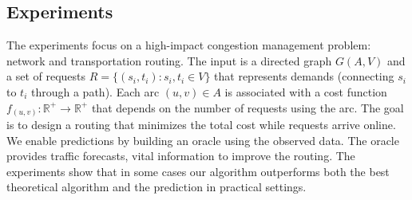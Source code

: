 %
%

\subsection{Experiments}
The experiments focus on a high-impact congestion management problem: network and transportation routing. The input is a directed graph $G(A,V)$ and a set of requests $R = \{(s_{i}, t_{i}) : s_{i}, t_{i} \in V\}$ that represents demands (connecting $s_{i}$ to $t_{i}$ through a path). Each arc $(u, v) \in A$ is associated with a cost function $f_{(u,v)}: \mathbb{R}^{+} \rightarrow \mathbb{R}^{+}$ that depends on the number of requests using the arc. The goal is to design a routing that minimizes the total cost while requests arrive online. We enable predictions by building an oracle using the observed data. The oracle provides traffic forecasts, vital information to improve the routing. The experiments show that in some cases our algorithm outperforms both the best theoretical algorithm and the prediction in practical settings.


